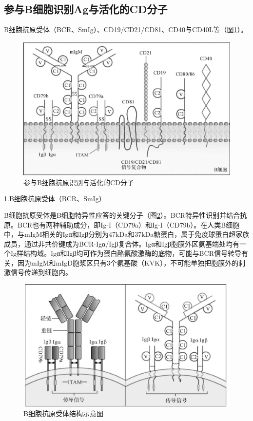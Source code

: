 \subsection{参与B细胞识别Ag与活化的CD分子}

B细胞抗原受体（BCR、SmIg）、CD19/CD21/CD81、CD40与CD40L等（图\ref{fig8-4}）。

\begin{figure}[!htbp]
 \centering
 \includegraphics{./images/Image00114.jpg}
 \captionsetup{justification=centering}
 \caption{参与B细胞抗原识别与活化的CD分子}
 \label{fig8-4}
  \end{figure} 

1.B细胞抗原受体（BCR、SmIg）

B细胞抗原受体是B细胞特异性应答的关键分子（图\ref{fig8-5}）。BCR特异性识别并结合抗原。BCR也有两种辅助成分，即Ig-I（CD79a）和Ig-I（CD79b）。在人类B细胞中，与mIgM相关的Igα和Igβ分别为47kDa和37kDa糖蛋白，属于免疫球蛋白超家族成员，通过非共价键成为BCR-Igα/Igβ复合体。Igα和Igβ胞膜外区氨基端处均有一个Ig样结构域。Igα和Igβ均可作为蛋白酪氨酸激酶的底物，可能与BCR信号转导有关，因为mIgM和mIgD胞浆区只有3个氨基酸（KVK），不可能单独把胞膜外的刺激信号传递到细胞内。

\begin{figure}[!htbp]
 \centering
 \includegraphics{./images/Image00115.jpg}
 \captionsetup{justification=centering}
 \caption{B细胞抗原受体结构示意图}
 \label{fig8-5}
  \end{figure} 


